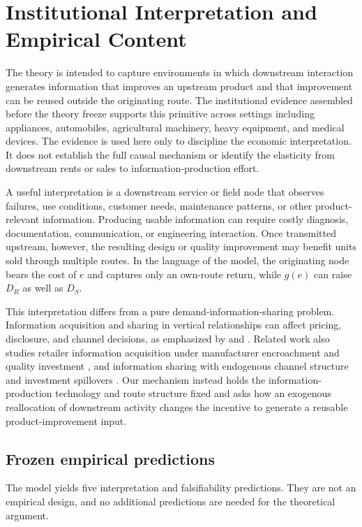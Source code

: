 \section{Institutional Interpretation and Empirical Content}\label{sec:institutional}

The theory is intended to capture environments in which downstream interaction generates information that improves an upstream product and that improvement can be reused outside the originating route. The institutional evidence assembled before the theory freeze supports this primitive across settings including appliances, automobiles, agricultural machinery, heavy equipment, and medical devices. The evidence is used here only to discipline the economic interpretation. It does not establish the full causal mechanism or identify the elasticity from downstream rents or sales to information-production effort.

A useful interpretation is a downstream service or field node that observes failures, use conditions, customer needs, maintenance patterns, or other product-relevant information. Producing usable information can require costly diagnosis, documentation, communication, or engineering interaction. Once transmitted upstream, however, the resulting design or quality improvement may benefit units sold through multiple routes. In the language of the model, the originating node bears the cost of $e$ and captures only an own-route return, while $g(e)$ can raise $D_R$ as well as $D_S$.

This interpretation differs from a pure demand-information-sharing problem. Information acquisition and sharing in vertical relationships can affect pricing, disclosure, and channel decisions, as emphasized by \citet{Guo2009} and \citet{GuoIyer2010}. Related work also studies retailer information acquisition under manufacturer encroachment and quality investment \citep{HuEtAl2021}, and information sharing with endogenous channel structure and investment spillovers \citep{HuangChenGuan2020}. Our mechanism instead holds the information-production technology and route structure fixed and asks how an exogenous reallocation of downstream activity changes the incentive to generate a reusable product-improvement input.

\subsection{Frozen empirical predictions}

The model yields five interpretation and falsifiability predictions. They are not an empirical design, and no additional predictions are needed for the theoretical argument.

